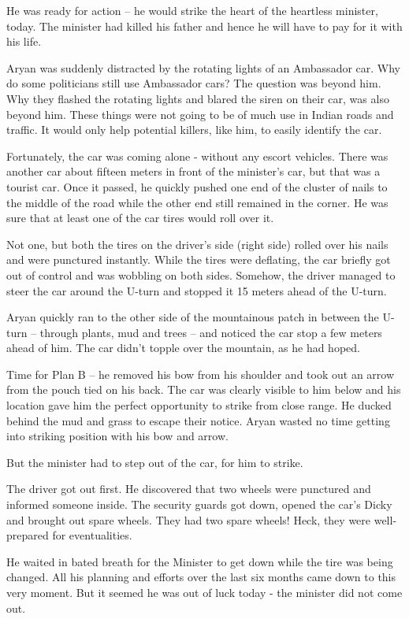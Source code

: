 He was ready for action – he would strike the heart of the heartless minister,
today. The minister had killed his father and hence he will have to pay for it
with his life.

Aryan was suddenly distracted by the rotating lights of an Ambassador car. Why
do some politicians still use Ambassador cars? The question was beyond him. Why
they flashed the rotating lights and blared the siren on their car, was also
beyond him. These things were not going to be of much use in Indian roads and
traffic. It would only help potential killers, like him, to easily identify the
car.

Fortunately, the car was coming alone - without any escort vehicles. There was
another car about fifteen meters in front of the minister's car, but that was a
tourist car. Once it passed, he quickly pushed one end of the cluster of nails
to the middle of the road while the other end still remained in the corner. He
was sure that at least one of the car tires would roll over it.

Not one, but both the tires on the driver's side (right side) rolled over his
nails and were punctured instantly. While the tires were deflating, the car
briefly got out of control and was wobbling on both sides. Somehow, the driver
managed to steer the car around the U-turn and stopped it 15 meters ahead of the
U-turn.

Aryan quickly ran to the other side of the mountainous patch in between the
U-turn – through plants, mud and trees – and noticed the car stop a few meters
ahead of him. The car didn't topple over the mountain, as he had hoped.

Time for Plan B – he removed his bow from his shoulder and took out an arrow
from the pouch tied on his back. The car was clearly visible to him below and
his location gave him the perfect opportunity to strike from close range. He
ducked behind the mud and grass to escape their notice. Aryan wasted no time
getting into striking position with his bow and arrow.

But the minister had to step out of the car, for him to strike.

The driver got out first. He discovered that two wheels were punctured and
informed someone inside. The security guards got down, opened the car's Dicky
and brought out spare wheels. They had two spare wheels! Heck, they were
well-prepared for eventualities.

He waited in bated breath for the Minister to get down while the tire was being
changed. All his planning and efforts over the last six months came down to this
very moment. But it seemed he was out of luck today - the minister did not come
out.


